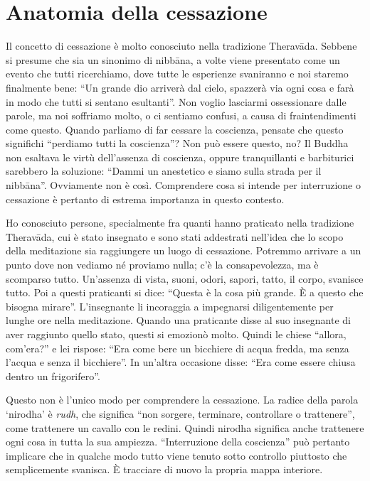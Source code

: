 \section*{Anatomia della cessazione}

Il concetto di cessazione è molto conosciuto nella tradizione Theravāda. Sebbene si presume che sia un sinonimo di nibbāna, a volte viene presentato come un evento che tutti ricerchiamo, dove tutte le esperienze svaniranno e noi staremo finalmente bene: ``Un grande dio arriverà dal cielo, spazzerà via ogni cosa e farà in modo che tutti si sentano esultanti''. Non voglio lasciarmi ossessionare dalle parole, ma noi soffriamo molto, o ci sentiamo confusi, a causa di fraintendimenti come questo. Quando parliamo di far cessare la coscienza, pensate che questo significhi ``perdiamo tutti la coscienza''? Non può essere questo, no? Il Buddha non esaltava le virtù dell'assenza di coscienza, oppure tranquillanti e barbiturici sarebbero la soluzione: ``Dammi un anestetico e siamo sulla strada per il nibbāna''. Ovviamente non è così. Comprendere cosa si intende per interruzione o cessazione è pertanto di estrema importanza in questo contesto.

Ho conosciuto persone, specialmente fra quanti hanno praticato nella tradizione Theravāda, cui è stato insegnato e sono stati addestrati nell'idea che lo scopo della meditazione sia raggiungere un luogo di cessazione. Potremmo arrivare a un punto dove non vediamo né proviamo nulla; c'è la consapevolezza, ma è scomparso tutto. Un'assenza di vista, suoni, odori, sapori, tatto, il corpo, svanisce tutto. Poi a questi praticanti si dice: ``Questa è la cosa più grande. È a questo che bisogna mirare''. L'insegnante li incoraggia a impegnarsi diligentemente per lunghe ore nella meditazione. Quando una praticante disse al suo insegnante di aver raggiunto quello stato, questi si emozionò molto. Quindi le chiese ``allora, com'era?'' e lei rispose: ``Era come bere un bicchiere di acqua fredda, ma senza l'acqua e senza il bicchiere''. In un'altra occasione disse: ``Era come essere chiusa dentro un frigorifero''.

Questo non è l'unico modo per comprendere la cessazione. La radice della parola `nirodha' è \textit{rudh}, che significa ``non sorgere, terminare, controllare o trattenere'', come trattenere un cavallo con le redini. Quindi nirodha significa anche trattenere ogni cosa in tutta la sua ampiezza. ``Interruzione della coscienza'' può pertanto implicare che in qualche modo tutto viene tenuto sotto controllo piuttosto che semplicemente svanisca. È tracciare di nuovo la propria mappa interiore.

